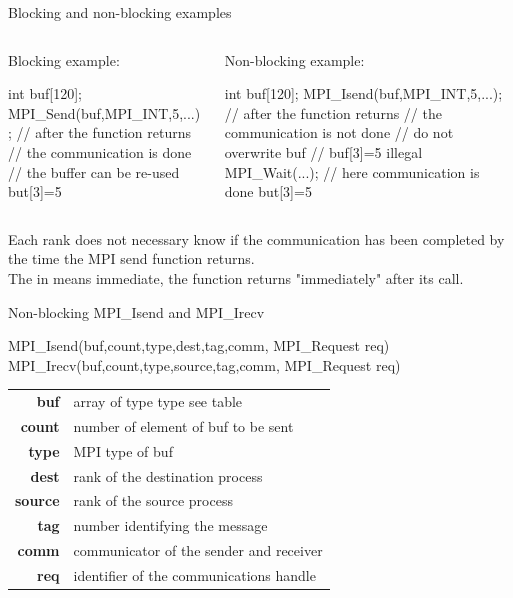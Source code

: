 \documentclass[aspectratio=43]{beamer}
\begin{document}
\begin{frame}[fragile]{Blocking and non-blocking examples}
    \begin{columns}
        \begin{column}{0.45\paperwidth}
            Blocking example:
\begin{Pseudolisting}[]{}
int buf[120];
MPI_Send(buf,MPI_INT,5,...);
// after the function returns
// the communication is done
// the buffer can be re-used
but[3]=5
\end{Pseudolisting}
        \end{column}
        \begin{column}{0.45\paperwidth}
            Non-blocking example:
\begin{Pseudolisting}[]{}
int buf[120];
MPI_Isend(buf,MPI_INT,5,...);
// after the function returns
// the communication is not done
// do not overwrite buf
// buf[3]=5 illegal
MPI_Wait(...);
// here communication is done
but[3]=5
\end{Pseudolisting}
        \end{column}
    \end{columns}
Each rank does not necessary know if the communication has been completed by the time the MPI send function returns.\\
The  in  means {\color{cscsred}immediate}, the function returns "immediately" after its call.
\end{frame}

\begin{frame}[fragile]{Non-blocking MPI\_Isend and MPI\_Irecv}
\begin{Pseudolisting}[]{}
MPI_Isend(buf,count,type,dest,tag,comm, MPI_Request req)
MPI_Irecv(buf,count,type,source,tag,comm, MPI_Request req)
\end{Pseudolisting}
\begin{black1block}{}
\begin{tabular}{rl}
    \textbf{buf} & array of type type see table\\
    \textbf{count} & number of element of buf to be sent\\
    \textbf{type} & MPI type of buf\\
    \textbf{dest} & rank of the destination process\\
    \textbf{source} & rank of the source process\\
    \textbf{tag} & number identifying the message\\
    \textbf{comm} & communicator of the sender and receiver\\
    \textbf{req} &  identifier of the communications handle\\
\end{tabular}
\end{black1block}
\end{frame}
\end{document}
